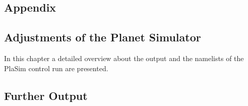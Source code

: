 \documentclass[12pt,a4paper,twoside,openright,headinclude,liststotoc,bibtotoc]{scrreprt}
\begin{document}
\listoffigures

\begin{appendix}
\vspace{-0.4cm}
\chapter{Appendix}
\vspace{-0.4cm}
\section{Adjustments of the Planet Simulator}
\vspace{-0.4cm}
In this chapter a detailed overview about the output and the namelists of the PlaSim control run are presented.



\newpage

\section{Further Output}



\end{appendix}
\end{document}
